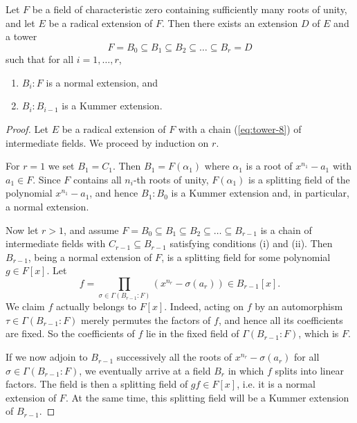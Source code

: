 \begin{lemma}
	Let $F$ be a field of characteristic zero containing sufficiently many roots of unity, and let $E$ be a radical extension of $F$. Then there exists an extension $D$ of $E$ and a tower
	\begin{equation}\label{eq:tower-9}
		F = B_0 \subseteq B_1 \subseteq B_2 \subseteq \dots \subseteq  B_r = D
	\end{equation}
	such that for all $i = 1, \dots, r$,
	\begin{enumerate}
		\item $B_i : F$ is a normal extension, and
		\item $B_i : B_{i - 1}$ is a Kummer extension.
	\end{enumerate}
	\begin{proof}
		Let $E$ be a radical extension of $F$ with a chain (\ref{eq:tower-8}) of intermediate fields. We proceed by induction on $r$.
		
		For $r = 1$ we set $B_1 = C_1$. Then $B_1 = F(\alpha_1)$ where $\alpha_1$ is a root of $x^{n_1} - a_1$ with $a_1 \in F$. Since $F$ contains all $n_i$-th roots of unity, $F(\alpha_1)$ is a splitting field of the polynomial $x^{n_1} - a_1$, and hence $B_1 : B_0$ is a Kummer extension and, in particular, a normal extension.
		
		Now let $r > 1$, and assume $F = B_0 \subseteq B_1 \subseteq B_2 \subseteq \dots \subseteq B_{r - 1}$ is a chain of intermediate fields with $C_{r - 1} \subseteq B_{r - 1}$ satisfying conditions (i) and (ii). Then $B_{r - 1}$, being a normal extension of $F$, is a splitting field for some polynomial $g \in F[x]$. Let
		\[
			f = \prod_{\sigma \in \Gamma(B_{r - 1} : F)}{(x^{n_r} - \sigma(a_r))} \in B_{r - 1}[x].
		\]
		We claim $f$ actually belongs to $F[x]$. Indeed, acting on $f$ by an automorphism $\tau \in \Gamma(B_{r - 1} : F)$ merely permutes the factors of $f$, and hence all its coefficients are fixed. So the coefficients of $f$ lie in the fixed field of $\Gamma(B_{r - 1} : F)$, which is $F$.
		
		If we now adjoin to $B_{r - 1}$ successively all the roots of $x^{n_r} - \sigma(a_r)$ for all $\sigma \in \Gamma(B_{r - 1} : F)$, we eventually arrive at a field $B_r$ in which $f$ splits into linear factors. The field is then a splitting field of $gf \in F[x]$, i.e. it is a normal extension of $F$. At the same time, this splitting field will be a Kummer extension of $B_{r - 1}$.
	\end{proof}
\end{lemma}

